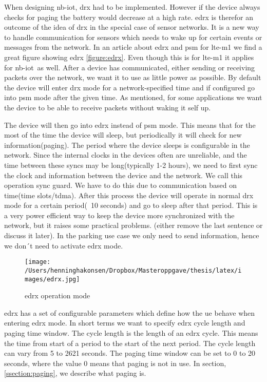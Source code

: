 \documentclass[USenglish]{ifimaster}  %
\begin{document}
When designing \acrshort{nb-iot}, \acrshort{drx} had to be implemented. However if the device always checks for paging the battery would decrease at a high rate. \acrshort{edrx} is therefor an outcome of the idea of \acrshort{drx} in the special case of sensor networks. It is a new way to handle communication for sensors which needs to wake up for certain events or messages from the network. In an article about \acrshort{edrx} and \acrshort{psm} for \acrshort{lte-m1} we find a great figure showing \acrshort{edrx} \vref{figure:edrx}. Even though this is for \acrshort{lte-m1} it applies for \acrshort{nb-iot} as well. After a device has communicated, either sending or receiving packets over the network, we want it to use as little power as possible. By default the device will enter \acrshort{drx} mode for a network-specified time and if configured go into \acrshort{psm} mode after the given time. As mentioned, for some applications we want the device to be able to receive packets without waking it self up.

The device will then go into \acrshort{edrx} instead of \acrshort{psm} mode. This means that for the most of the time the device will sleep, but periodically it will check for new information(paging). The period where the device sleeps is configurable in the network. Since the internal clocks in the devices often are unreliable, and the time between these syncs may be long(typically 1-2 hours), we need to first sync the clock and information between the device and the network. We call this operation sync guard. We have to do this due to communication based on time(time slots/\acrlong{tdma}). After this process the device will operate in normal \acrshort{drx} mode for a certain period(~10 seconds) and go to sleep after that period. This is a very power efficient way to keep the device more synchronized with the network, but it raises some practical problems. (either remove the last sentence or discuss it later). In the parking use case we only need to send information, hence we don´t need to activate \acrshort{edrx} mode.

\begin{figure}[ht]
  \centering\texttt{[image: /Users/henninghakonsen/Dropbox/Masteroppgave/thesis/latex/images/edrx.jpg]}
  \caption{\acrshort{edrx} operation mode \cite{online:edrxpsm}}
  \label{figure:edrx}
\end{figure}

\acrshort{edrx} has a set of configurable parameters which define how the \acrshort{ue} behave when entering \acrshort{edrx} mode. In short terms we want to specify \acrshort{edrx} cycle length and paging time window. The cycle length is the length of an \acrshort{edrx} cycle. This means the time from start of a period to the start of the next period. The cycle length can vary from 5 to 2621 seconds. The paging time window can be set to 0 to 20 seconds, where the value 0 means that paging is not in use. In section, \vref{ssection:paging}, we describe what paging is.
\end{document}
